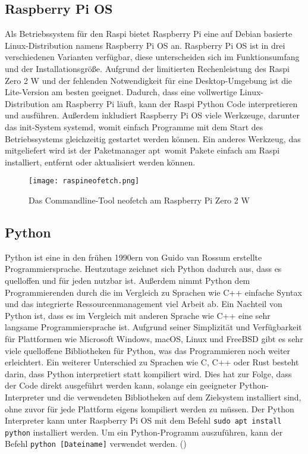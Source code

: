 \subsection{Raspberry Pi OS}
\label{subsec:tRasPiOS}
Als Betriebssystem für den \ac{Raspi} bietet Raspberry Pi eine auf Debian basierte Linux-Distribution namens Raspberry Pi \ac{OS} an. Raspberry Pi \ac{OS} ist in drei verschiedenen Varianten verfügbar, diese unterscheiden sich im Funktionsumfang und der Installationsgröße. Aufgrund der limitierten Rechenleistung des \ac{Raspi} Zero 2 W und der fehlenden Notwendigkeit für eine Desktop-Umgebung ist die Lite-Version am besten geeignet. Dadurch, dass eine vollwertige Linux-Distribution am Raspberry Pi läuft, kann der \ac{Raspi} Python Code interpretieren und ausführen. Außerdem inkludiert Raspberry Pi OS viele Werkzeuge, darunter das init-System \glqq systemd\grqq , womit einfach Programme mit dem Start des Betriebssystems gleichzeitig gestartet werden können. Ein anderes Werkzeug, das mitgeliefert wird ist der Paketmanager \glqq apt\grqq\ womit Pakete einfach am \ac{Raspi} installiert, entfernt oder aktualisiert werden können.
\begin{figure}[h]
\centering
\texttt{[image: raspineofetch.png]}
\caption{Das Commandline-Tool neofetch am Raspberry Pi Zero 2 W}
\label{fig:pineofetch}
\end{figure}

\subsection{Python}
\label{subsec:tPython}
Python ist eine in den frühen 1990ern von Guido van Rossum erstellte Programmiersprache. Heutzutage zeichnet sich Python dadurch aus, dass es quelloffen und für jeden nutzbar ist. Außerdem nimmt Python dem Programmierenden durch die im Vergleich zu Sprachen wie C++ einfache Syntax und das integrierte Ressourcenmanagement viel Arbeit ab. Ein Nachteil von Python ist, dass es im Vergleich mit anderen Sprache wie C++ eine sehr langsame Programmiersprache ist. Aufgrund seiner Simplizität und Verfügbarkeit für Plattformen wie Microsoft Windows, macOS, Linux und FreeBSD gibt es sehr viele quelloffene Bibliotheken für Python, was das Programmieren noch weiter erleichtert. Ein weiterer Unterschied zu Sprachen wie C, C++ oder Rust besteht darin, dass Python interpretiert statt kompiliert wird. Dies hat zur Folge, dass der Code direkt ausgeführt werden kann, solange ein geeigneter Python-Interpreter und die verwendeten Bibliotheken auf dem Zielsystem installiert sind, ohne zuvor für jede Plattform eigens kompiliert werden zu müssen. Der Python Interpreter kann unter Raspberry Pi OS mit dem Befehl \verb|sudo apt install python| installiert werden. Um ein Python-Programm auszuführen, kann der Befehl \verb|python [Dateiname]| verwendet werden.
(\cite{matthes-2019})

